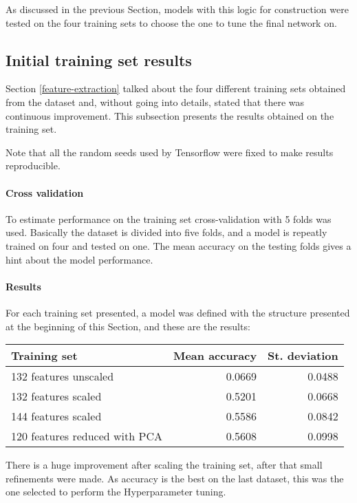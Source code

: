 As discussed in the previous Section, models with this logic for 
construction were tested on the four training sets to choose the one to tune 
the final network on.

\subsection{Initial training set results}

Section \vref{feature-extraction} talked about the four different 
training sets obtained from the dataset and, without going into details, 
stated that there was continuous improvement. This subsection presents
the results obtained on the training set. 

Note that all the random seeds used by Tensorflow were fixed 
to make results reproducible.

\paragraph{Cross validation}
To estimate performance on the training set cross-validation with 
5 folds was used. Basically the dataset is divided into five folds, 
and a model is repeatly trained on four and tested on one. 
The mean accuracy on the testing folds gives a hint about the model performance.

\paragraph{Results}
For each training set presented, a model was defined 
with the structure presented at the beginning of this Section, 
and these are the results:

\begin{center}
    \begin{tabular}{ |l|r|r| } 
        \hline
        Training set & Mean accuracy & St. deviation \\
        \hline
        132 features unscaled &  0.0669 & 0.0488 \\
        132 features scaled &  0.5201 & 0.0668 \\
        144 features scaled &  0.5586 & 0.0842 \\
        120 features reduced with PCA &  0.5608 & 0.0998 \\
        \hline
    \end{tabular}
\end{center}

There is a huge improvement after scaling the training set, after 
that small refinements were made.
As accuracy is the best on the last dataset, this was the one selected to 
perform the Hyperparameter tuning.

